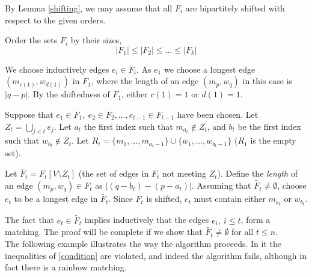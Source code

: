 \documentclass{amsart}
\theoremstyle{remark}
\begin{document}
 By Lemma \ref{shifting}, we may assume that all $F_i$
 are bipartitely shifted with respect to the given orders.



Order the sets $F_i$ by their sizes,
\begin{equation}\label{monotone}
|F_1| \le |F_2| \le \ldots \le |F_k|
\end{equation}

We  choose inductively edges $e_i \in F_i$. As $e_1$ we choose a
longest edge $(m_{c(1)},w_{d(1)})$ in $F_1$,
where the length of an edge $(m_p,w_q)$ in this case is $|q-p|$. By the shiftedness of
$F_1$, either $c(1)=1$ or $d(1)=1$.


Suppose  that  $e_1 \in F_1, ~e_2 \in F_2, \ldots, e_{t-1} \in
F_{t-1}$ have been chosen. Let $Z_t =\bigcup_{j < t} e_j$. Let $a_t$
the first index such that $m_{a_t} \not \in Z_t$, and $b_t$ be the
first index such that $w_{b_t} \not \in Z_t$. Let $R_t =\{m_1,
\ldots ,m_{a_t-1}\} \cup \{w_1, \ldots ,w_{b_t-1}\}$ ($R_1$ is the
empty set).

Let $\tilde{F_t}=F_t[V \setminus Z_t]$ (the set of edges in $F_t$ not meeting $Z_t$).
Define the {\em length} of an edge $(m_p,w_q) \in {F_t}$ as $|(q-b_t)-(p-a_t)|$.
Assuming that $\tilde{F_t}\neq \emptyset$, choose $e_t$ to be a longest edge in $\tilde{F_t}$.
Since $F_t$ is shifted, $e_t$ must contain either $m_{a_t}$ or $w_{b_t}$.


The fact that $e_t\in \tilde{F_t}$ implies inductively that the edges
$e_i,~i \le t$, form a matching. The
proof will be complete if we show that $\tilde{F_t} \neq \emptyset$
for all $t \le n$. \\

The following example illustrates the way the algorithm proceeds. In
it the inequalities of \eqref{condition} are violated, and indeed
the algorithm fails, although in fact there is a rainbow matching.
\end{document}
